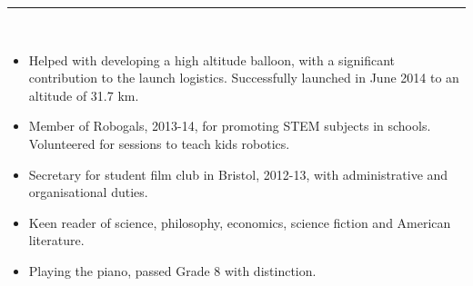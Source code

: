 \documentclass[10pt]{article}
\begin{document}
\noindent\rule{505pt}{0.6pt}\\
	\begin{itemize}
		\item Helped with developing a high altitude balloon, with a significant contribution to the launch logistics. Successfully launched in June 2014 to an altitude of 31.7 km. 
		\item Member of Robogals, 2013-14, for promoting STEM subjects in schools. Volunteered for sessions to teach kids robotics.
		\item Secretary for student film club in Bristol, 2012-13, with administrative and organisational duties. 
		\item Keen reader of science, philosophy, economics, science fiction and American literature.
		\item Playing the piano, passed Grade 8 with distinction.
\end{itemize}
\end{document}
